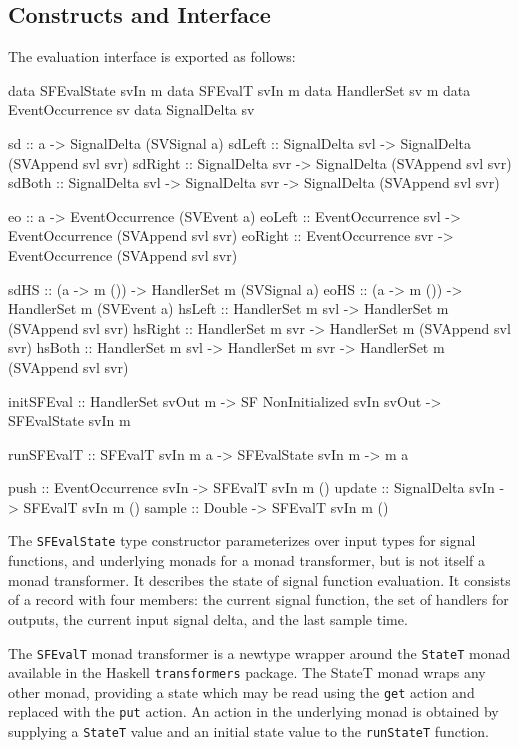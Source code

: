 \subsection{Constructs and Interface}
\label{section:Implementation-Evaluation_Interface-Constructs_and_Interface}

The evaluation interface is exported as follows:

\begin{code}
data SFEvalState svIn m
data SFEvalT svIn m
data HandlerSet sv m
data EventOccurrence sv
data SignalDelta sv

sd      :: a -> SignalDelta (SVSignal a)
sdLeft  :: SignalDelta svl -> SignalDelta (SVAppend svl svr)
sdRight :: SignalDelta svr -> SignalDelta (SVAppend svl svr)
sdBoth  :: SignalDelta svl -> SignalDelta svr 
        -> SignalDelta (SVAppend svl svr)

eo      :: a -> EventOccurrence (SVEvent a)
eoLeft  :: EventOccurrence svl -> EventOccurrence (SVAppend svl svr)
eoRight :: EventOccurrence svr -> EventOccurrence (SVAppend svl svr)

sdHS    :: (a -> m ()) -> HandlerSet m (SVSignal a)
eoHS    :: (a -> m ()) -> HandlerSet m (SVEvent a)
hsLeft  :: HandlerSet m svl -> HandlerSet m (SVAppend svl svr)
hsRight :: HandlerSet m svr -> HandlerSet m (SVAppend svl svr)
hsBoth  :: HandlerSet m svl -> HandlerSet m svr 
        -> HandlerSet m (SVAppend svl svr)

initSFEval :: HandlerSet svOut m 
           -> SF NonInitialized svIn svOut 
           -> SFEvalState svIn m

runSFEvalT :: SFEvalT svIn m a -> SFEvalState svIn m -> m a

push   :: EventOccurrence svIn -> SFEvalT svIn m ()
update :: SignalDelta svIn -> SFEvalT svIn m ()
sample :: Double -> SFEvalT svIn m ()
\end{code}

The {\tt SFEvalState} type constructor parameterizes over input types for signal
functions, and underlying monads for a monad transformer, but is not itself
a monad transformer. It describes the state of signal function evaluation.
It consists of a record with four members: the current signal function,
the set of handlers for outputs, the current input signal delta, and the last
sample time.

The {\tt SFEvalT} monad transformer is a newtype wrapper around the {\tt StateT}
monad available in the Haskell {\tt transformers} package. The StateT monad
wraps any other monad, providing a state which may be read using the {\tt get}
action and replaced with the {\tt put} action. An action in the underlying
monad is obtained by supplying a {\tt StateT} value and an initial state
value to the {\tt runStateT} function.

